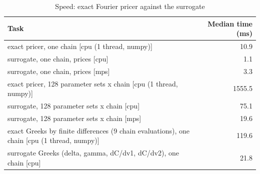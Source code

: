\begin{table}[ht]
\centering
\small
\caption{Speed: exact Fourier pricer against the surrogate}
\begin{tabular}{lr}
\toprule
Task & Median time (ms) \\
\midrule
exact pricer, one chain [cpu (1 thread, numpy)] & 10.9 \\
surrogate, one chain, prices [cpu] & 1.1 \\
surrogate, one chain, prices [mps] & 3.3 \\
exact pricer, 128 parameter sets x chain [cpu (1 thread, numpy)] & 1555.5 \\
surrogate, 128 parameter sets x chain [cpu] & 75.1 \\
surrogate, 128 parameter sets x chain [mps] & 19.6 \\
exact Greeks by finite differences (9 chain evaluations), one chain [cpu (1 thread, numpy)] & 119.6 \\
surrogate Greeks (delta, gamma, dC/dv1, dC/dv2), one chain [cpu] & 21.8 \\
\bottomrule
\end{tabular}
\par{}
\end{table}
